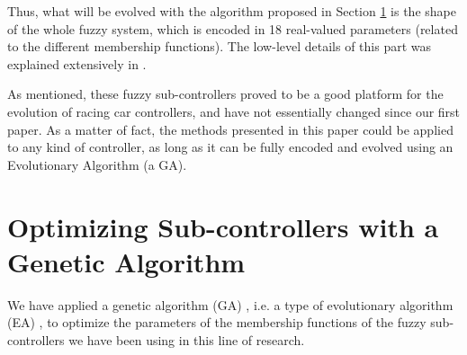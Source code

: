 \documentclass[10pt,journal,compsoc]{IEEEtran}
\begin{document}
Thus, what will be evolved with the algorithm proposed in Section \ref{sec:ga} is the shape of the whole fuzzy system, which is encoded in 18 real-valued parameters (related to the different membership functions). The low-level details of this part was explained extensively in \cite{DBLP:conf/cig/SalemMG19}. 

As mentioned, these fuzzy sub-controllers proved to be a good platform for the evolution of racing car controllers, and have not essentially changed since our first paper. As a matter of fact, the methods presented in this paper could
be applied to any kind of controller, as long as it can be fully
encoded and evolved using an Evolutionary Algorithm (a GA).




\section{Optimizing Sub-controllers with a Genetic Algorithm}
\label{sec:ga}




We have applied a genetic algorithm (GA) \cite{GAs_Goldberg89}, i.e. a type of evolutionary algorithm (EA) \cite{EAs_Back96}, to optimize the parameters of the membership functions of the fuzzy sub-controllers we have been using in this line of research.
\end{document}
